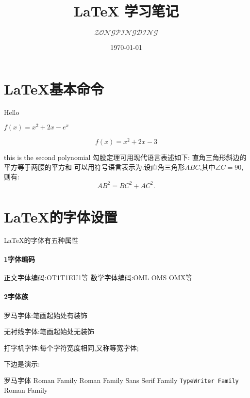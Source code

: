 \documentclass[fontset=windows]{article}
\title{\LaTeX{} 学习笔记}
\author{\textit{$\mathscr{ZONGPINGDING}$}}
\date{\today}%
\begin{document}
    \maketitle
    \tableofcontents 
    \section{LaTeX基本命令}
    Hello

    $f(x)=x^2+2x-e^x$ %

    $$f(x)=x^2+2x-3$$

    this is the second polynomial%
    勾股定理可用现代语言表述如下:
    直角三角形斜边的平方等于两腰的平方和
    可以用符号语言表示为:设直角三角形$ABC$,其中$\angle C=90$,则有:
    \begin{equation}
        AB^2=BC^2+AC^2.
    \end{equation}
    \section{LaTeX的字体设置}
    LaTeX的字体有五种属性
    \paragraph{1字体编码}
    正文字体编码:OT1T1EU1等
    数学字体编码:OML OMS OMX等
    \paragraph{2字体族}
    罗马字体:笔画起始处有装饰

    无衬线字体:笔画起始处无装饰

    打字机字体:每个字符宽度相同,又称等宽字体;

    下边是演示:

    \textrm{罗马字体 Roman Family}%
    \textrm{Roman Family} \textsf{Sans Serif Family} \texttt{TypeWriter Family}
    \rmfamily Roman Family
\end{document}
